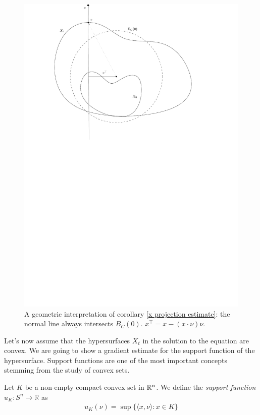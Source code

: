 \begin{figure}
	\centering
	\includegraphics[width=\textwidth]{"figures/10_geometric_idea"}
	\caption{A geometric interpretation of corollary \ref{x projection estimate}: the normal line always intersects $B_C(0)$. $x^\top = x - (x \cdot \nu) \nu$.}
\end{figure}

Let's now assume that the hypersurfaces $X_t$ in the solution to the equation are convex. We are going to show a gradient estimate for the support function of the hypersurface. Support functions are one of the most important concepts stemming from the study of convex sets. 
\begin{defin}
	Let $K$ be a non-empty compact convex set in $\mathbb{R}^n$. We define the {\em support function} $u_K:  S^n \to \mathbb{R} $ as 
	\begin{align*}
		u_K (\nu) = \sup\{\langle x, \nu \rangle : x\in K \}
	\end{align*}
\end{defin}

